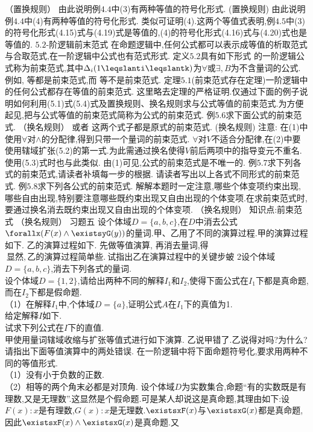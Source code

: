 {（置换规则）
由此说明例$4.4$中(3)有两种等值的符号化形式.
(置换规则)
由此说明例$4.4$中(4)有两种等值的符号化形式.
类似可证明(4).这两个等值式表明,例$4.5$中(3)的符号化形式(4.15)式与(4.19)式是等值的,(4)的符号化形式(4.16)式与(4.20)式也是等值的.
{$5.2$-阶逻辑前末范式}
在命题逻辑中,任何公式都可以表示成等值的析取范式与合取范式,在一阶逻辑中公式也有范式形式.
定义$5.2$具有如下形式
的一阶逻辑公式称为前束范式,其中$\Delta_{i}(1\leqslanti\leqslantk)$为$\forall$或$\exists,B$为不含量词的公式.
例如,
等都是前束范式,而
等不是前束范式.
定理$5.1$(前束范式存在定理)一阶逻辑中的任何公式都存在等值的前束范式.
这里略去定理的严格证明.仅通过下面的例子说明如何利用(5.1)式(5.4)式及置换规则、换名规则求与公式等值的前束范式.为方便起见,把与公式等值的前束范式简称为公式的前束范式.
例$5.6$求下面公式的前束范式.
（换名规则）
或者
这两个式子都是原式的前束范式.
(换名规则)
注意:
在(1)中使用$\forall$对$\wedge$的分配律,得到只带一个量词的前束范式.
$\forall$对$V$不适合分配律,在(2)中要使用辖域扩张(5.2)的第一式.为此需通过换名使得$V$前后两项中的指导变元不重名.使用(5.3)式时也与此类似.
由(1)可见,公式的前束范式是不唯一的.
例$5.7$求下列各式的前束范式,请读者补填每一步的根据.
请读者写出以上各式不同形式的前束范式.
例$5.8$求下列各公式的前束范式.
解解本题时一定注意,哪些个体变项约束出现,哪些自由出现,特别要注意哪些既约束出现又自由出现的个体变项.在求前束范式时,要通过换名消去既约束出现又自由出现的个体变项.
（换名规则）
知识点:前束范式
（换名规则）
{习题五}
设个体域$D=\{a,b,c\}$,在$D$中消去公式$\forallx(F(x)\wedge\existsyG(y))$的量词.甲、乙用了不同的演算过程.甲的演算过程如下.
乙的演算过程如下.
先做等值演算,
再消去量词,得
$\mathrm{~显然,乙的演算过程简单些.~试指出乙在演算过程中的关键步蚾}$
2设个体域$D=\{a,b,c\}$,消去下列各式的量词.\\
设个体域$D=\{1,2\}$,请给出两种不同的解释$I_{1}$和$I_{2}$,使得下面公式在$I_{1}$下都是真命题,而在$I_{2}$下都是假命题.\\
（1）在解释$I_{1}$中,个体域$D=\{a\}$,证明公式$A$在$I_{1}$下的真值为1.\\
给定解释$I$如下.\\
试求下列公式在$I$下的直值.\\
甲使用量词辖域收缩与扩张等值式进行如下演算.
乙说甲错了.乙说得对吗?为什么?
请指出下面等值演算中的两处错误.
在一阶逻辑中将下面命题符号化,要求用两种不同的等值形式.\\
（1）没有小于负数的正数.\\
（2）相等的两个角末必都是对顶角.
设个体域$D$为实数集合,命题“有的实数既是有理数,又是无理数”.这显然是个假命题.可是某人却说这是真命题,其理由如下:设$F(x):x$是有理数,$G(x):x$是无理数.$\existsxF(x)$与$\existsxG(x)$都是真命题,因此$\existsxF(x)\wedge\existsxG(x)$是真命题.又
}
